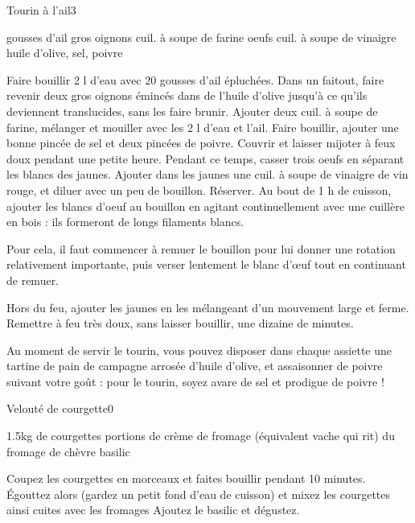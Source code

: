 \begin{recette}{Tourin à l'ail}{3}{}{}
\begin{ingredients}
 gousses d'ail
 gros oignons
 cuil. à soupe de farine
 oeufs
 cuil. à soupe de vinaigre
\ingredient huile d'olive, sel, poivre
\end{ingredients}

\begin{preparation}
\etape Faire bouillir 2 l d'eau avec 20 gousses d'ail épluchées.
\etape Dans un faitout, faire revenir deux gros oignons émincés dans de l'huile d'olive jusqu'à ce qu'ils deviennent translucides, sans les faire brunir.
\etape Ajouter deux cuil. à soupe de farine, mélanger et mouiller avec les 2 l d'eau et l'ail.
\etape Faire bouillir, ajouter une bonne pincée de sel et deux pincées de poivre.
\etape Couvrir et laisser mijoter à feux doux pendant une petite heure.
\etape Pendant ce temps, casser trois oeufs en séparant les blancs des jaunes.
\etape Ajouter dans les jaunes une cuil. à soupe de vinaigre de vin rouge, et diluer avec un peu de bouillon. Réserver.
\etape Au bout de 1 h de cuisson, ajouter les blancs d'oeuf au bouillon en agitant continuellement avec une cuillère en bois : ils formeront de longs filaments blancs.
\begin{remarque}
Pour cela, il faut commencer à remuer le bouillon pour lui donner une rotation relativement importante, puis verser lentement le blanc d'œuf tout en continuant de remuer.
\end{remarque}
\etape Hors du feu, ajouter les jaunes en les mélangeant d'un mouvement large et ferme.
\etape Remettre à feu très doux, sans laisser bouillir, une dizaine de minutes.
\end{preparation}

\begin{remarque}
Au moment de servir le tourin, vous pouvez disposer dans chaque assiette une tartine de pain de campagne arrosée d'huile d'olive, et assaisonner de poivre suivant votre goût : pour le tourin, soyez avare de sel et prodigue de poivre !
\end{remarque}
\end{recette}

\begin{recette}{Velouté de courgette}{0}{}{}
\begin{ingredients}
\ingredient 1.5kg de courgettes
 portions de crème de fromage (équivalent vache qui rit)
\ingredient du fromage de chèvre
\ingredient basilic
\end{ingredients}

\begin{preparation}
\etape Coupez les courgettes en morceaux et faites bouillir pendant 10 minutes. 
\etape Égouttez alors (gardez un petit fond d'eau de cuisson) et mixez les courgettes ainsi cuites avec les fromages
\etape Ajoutez le basilic et dégustez.
\end{preparation}
\end{recette}
